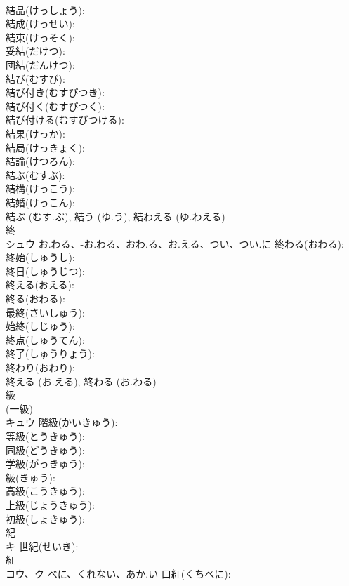 \documentclass[8pt]{extreport}
\begin{document}
\begin{CJK}{UTF8}{min}
\\	結晶(けっしょう): 
\\	結成(けっせい): 
\\	結束(けっそく): 
\\	妥結(だけつ): 
\\	団結(だんけつ): 
\\	結び(むすび): 
\\	結び付き(むすびつき): 
\\	結び付く(むすびつく): 
\\	結び付ける(むすびつける): 
\\	結果(けっか): 
\\	結局(けっきょく): 
\\	結論(けつろん): 
\\	結ぶ(むすぶ): 
\\	結構(けっこう): 
\\	結婚(けっこん): 
\\	結ぶ (むす.ぶ), 結う (ゆ.う), 結わえる (ゆ.わえる)
\\	終			
\\	シュウ	お.わる、-お.わる、おわ.る、お.える、つい、つい.に	終わる(おわる): 
\\	終始(しゅうし): 
\\	終日(しゅうじつ): 
\\	終える(おえる): 
\\	終る(おわる): 
\\	最終(さいしゅう): 
\\	始終(しじゅう): 
\\	終点(しゅうてん): 
\\	終了(しゅうりょう): 
\\	終わり(おわり): 
\\	終える (お.える), 終わる (お.わる)
\\	級			
\\	(一級) 
\\	キュウ		階級(かいきゅう): 
\\	等級(とうきゅう): 
\\	同級(どうきゅう): 
\\	学級(がっきゅう): 
\\	級(きゅう): 
\\	高級(こうきゅう): 
\\	上級(じょうきゅう): 
\\	初級(しょきゅう): 
\\	紀			
\\	キ		世紀(せいき): 
\\	紅			
\\	コウ、ク	べに、くれない、あか.い	口紅(くちべに): 

\end{CJK}
\end{document}
